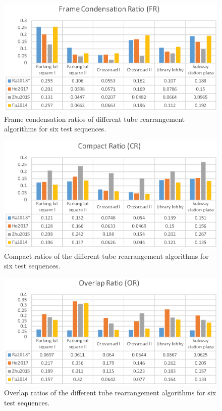 \documentclass[11pt]{hyu_thesis}
\begin{document}
\begin{figure}[t]
\begin{center}
\includegraphics[width=0.9\linewidth]{FCR.eps}
\end{center}
   \caption{Frame condensation ratios of different tube rearrangement algorithms for six test sequences.}
\label{fig:FCR}
\end{figure}

\begin{figure}[t]
\begin{center}
\includegraphics[width=0.9\linewidth]{CR.eps}
\end{center}
   \caption{Compact ratios of the different tube rearrangement algorithms for six test sequences.}
\label{fig:CR}
\end{figure}

\begin{figure}[t]
\begin{center}
\includegraphics[width=0.9\linewidth]{OR.eps}
\end{center}
   \caption{Overlap ratios of the different tube rearrangement algorithms for six test sequences.}
\label{fig:OR}
\end{figure}
\end{document}
